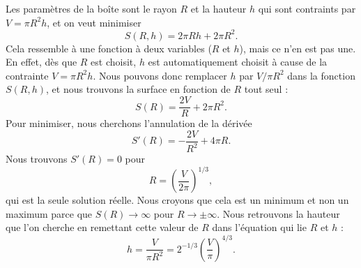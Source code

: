 \begin{corrige}{3}

Les paramètres de la boîte sont le rayon $R$ et la hauteur $h$ qui sont contraints par $V=\pi R^2h$, et on veut minimiser
\begin{equation}
	S(R,h)=2\pi Rh+2\pi R^2.
\end{equation}
Cela ressemble à une fonction à deux variables ($R$ et $h$), mais ce n'en est pas une. En effet, dès que $R$ est choisit, $h$ est automatiquement choisit à cause de la contrainte $V=\pi R^2h$. Nous pouvons donc remplacer $h$ par $V/\pi R^2$ dans la fonction $S(R,h)$, et nous trouvons la surface en fonction de $R$ tout seul :
\begin{equation}
	S(R)=\frac{ 2V }{ R }+2\pi R^2.
\end{equation}
Pour minimiser, nous cherchons l'annulation de la dérivée
\begin{equation}
	S'(R)=-\frac{ 2V }{ R^2 }+4\pi R.
\end{equation}
Nous trouvons $S'(R)=0$ pour
\begin{equation}
	R=\left( \frac{ V }{ 2\pi } \right)^{1/3},
\end{equation}
qui est la seule solution réelle. Nous croyons que cela est un minimum et non un maximum parce que $S(R)\to\infty$ pour $R\to\pm\infty$. Nous retrouvons la hauteur que l'on cherche en remettant cette valeur de $R$ dans l'équation qui lie $R$ et $h$ :
\begin{equation}
	h=\frac{ V }{ \pi R^2 }=2^{-1/3}\left( \frac{ V }{ \pi } \right)^{4/3}.
\end{equation}

\end{corrige}
